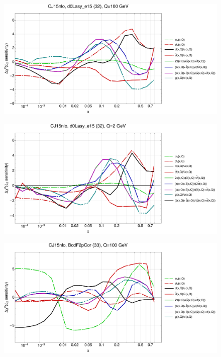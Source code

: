 \documentclass[10pt,aps,prd,floatfix,titlepage]{revtex4}
\begin{document}
\clearpage
\begin{figure}
\includegraphics[width=\textwidth,height=0.44\textheight,keepaspectratio]{2/32_CJ15nlo_q100_Sf_2.pdf}
\caption{}
\end{figure}
\begin{figure}
\includegraphics[width=\textwidth,height=0.44\textheight,keepaspectratio]{2/32_CJ15nlo_q2_Sf_2.pdf}
\caption{}
\end{figure}
\clearpage
\begin{figure}
\includegraphics[width=\textwidth,height=0.44\textheight,keepaspectratio]{2/33_CJ15nlo_q100_Sf_2.pdf}
\caption{}
\end{figure}
\end{document}
